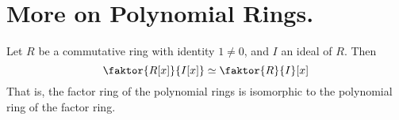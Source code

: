 
\section{More on Polynomial Rings.}
\label{section1}

\begin{definition}
    Let $R$ be a commutative ring with identity $1 \neq 0$, and $I$ an ideal of
    $R$. Then
    \begin{equation*}
        \faktor{R[x]}{I[x]} \simeq \faktor{R}{I}[x]
    \end{equation*}
    That is, the factor ring of the polynomial rings is isomorphic to the
    polynomial ring of the factor ring.
\end{definition}
